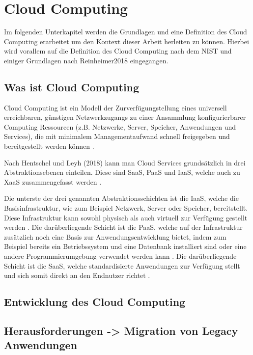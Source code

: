 \section{Cloud Computing}

Im folgenden Unterkapitel werden die Grundlagen und eine Definition des Cloud Computing erarbeitet um den Kontext dieser Arbeit herleiten zu können.
Hierbei wird vorallem auf die Definition des Cloud Computing nach dem NIST und einiger Grundlagen nach Reinheimer2018 eingegangen.

\subsection{Was ist Cloud Computing}

Cloud Computing ist ein Modell der Zurverfügungstellung eines universell erreichbaren,
günstigen Netzwerkzugangs zu einer Ansammlung konfigurierbarer Computing Ressourcen
(z.B. Netzwerke, Server, Speicher, Anwendungen und Services), die mit minimalem Managementaufwand schnell freigegeben und bereitgestellt werden können
\cite[Vgl.][S. 2]{Mell2011}.

Nach Hentschel und Leyh (2018) kann man Cloud Services grundsätzlich in drei Abstraktionsebenen einteilen. Diese sind \acf{SaaS},
\acf{PaaS} und \acf{IaaS}, welche auch zu \acf{XaaS} zusammengefasst werden
\cite[Vgl.][S. 9]{Reinheimer2018}.

Die unterste der drei genannten Abstraktionsschichten ist die \acf{IaaS}, welche die Basisinfrastruktur, wie zum Beispiel Netzwerk, Server oder Speicher,
bereitstellt. Diese Infrastruktur kann sowohl physisch als auch virtuell zur Verfügung gestellt werden \cite[Vgl.][S. 9f]{Reinheimer2018}.
Die darüberliegende Schicht ist die \acf{PaaS}, welche auf der Infrastruktur zusätzlich noch eine Basis zur Anwendungsentwicklung bietet, indem zum Beispiel
bereits ein Betriebssystem und eine Datenbank installiert sind oder eine andere Programmierumgebung verwendet werden kann \cite[Vgl.][S. 10]{Reinheimer2018}.
Die darüberliegende Schicht ist die \acf{SaaS}, welche standardisierte Anwendungen zur Verfügung stellt und sich somit direkt an den Endnutzer richtet
\cite[Vgl.][S. 11]{Reinheimer2018}.

\subsection{Entwicklung des Cloud Computing}

\subsection{Herausforderungen -> Migration von Legacy Anwendungen}